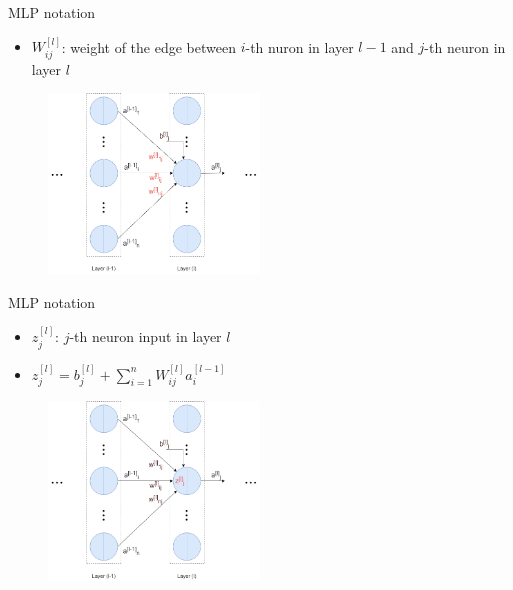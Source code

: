 \documentclass[compress,oilve,t]{beamer}
\begin{document}
\begin{frame}{MLP notation}
	\begin{itemize}
		\item $W^{[l]}_{ij}$: weight of the edge between $i$-th nuron in layer $l-1$ and $j$-th neuron in layer $l$ 
	\end{itemize}
	\begin{figure}[H]
		\centering
		\includegraphics[width=0.5\textwidth]{Figs/notation2.png}
	\end{figure}
\end{frame}

\begin{frame}{MLP notation}
	\begin{itemize}
		\item $z^{[l]}_j$: $j$-th neuron input in layer $l$
		\item $z^{[l]}_j = b_j^{[l]} + \sum_{i=1}^n W^{[l]}_{ij}a^{[l-1]}_i$
	\end{itemize}
	\begin{figure}[H]
		\centering
		\includegraphics[width=0.5\textwidth]{Figs/notation3.png}
	\end{figure}
\end{frame}
\end{document}
